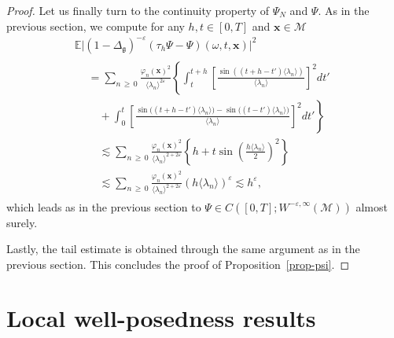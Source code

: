 \documentclass[10pt]{amsart}
\theoremstyle{definition}\newtheorem{defi}[theo]{Definition}\newtheorem{rema}[theo]{Remark}\newtheorem{exam}[theo]{Example}\newtheorem{exem}[theo]{Example}\newtheorem{nota}[theo]{Notation}
\renewcommand{\th}{\tau_h}
\newcommand{\E}{\mathbb{E}}
\newcommand{\x}{\mathbf{x}}
\newcommand{\M}{\mathcal{M}}
\newcommand{\g}{\mathfrak{g}}
\newcommand{\Dlg}{\Delta_{\g}}
\newcommand{\eps}{\varepsilon}
\renewcommand{\o}{\omega}
\newcommand{\les}{\lesssim}
\newcommand{\jb}[1] {\langle #1 \rangle}
\begin{document}
\begin{proof}
Let us finally turn to the continuity property of $\Psi_N$ and $\Psi$. As in the previous section, we compute for any $h,t\in [0,T]$ and $\x\in\M$
\begin{multline*}
\E\big|(1-\Dlg)^{-\eps}(\th \Psi-\Psi)(\o,t,\x)\big|^2 \\
\begin{aligned}
&= \sum_{n\,\geq\,0}\frac{\varphi_n(\x)^2}{\jb{\lambda_n}^{2\eps}}\left\{\int_t^{t+h}\left[\frac{\sin\left((t+h-t')\jb{\lambda_n}\right)}{\jb{\lambda_n}}\right]^2dt'\right. \\
&\quad+\left. \int_0^{t}\left[\frac{\sin\big((t+h-t')\jb{\lambda_n}\big)-\sin\big((t-t')\jb{\lambda_n}\big)}{\jb{\lambda_n}}\right]^2dt'\right\}\\
&\quad\les \sum_{n\,\geq\,0}\frac{\varphi_n(\x)^2}{\jb{\lambda_n}^{2+2\eps}}
\left\{h+t\sin\left(\frac{h\jb{\lambda_n}}{2}\right)^2\right\}\\
&\quad\les \sum_{n\,\geq\,0}\frac{\varphi_n(\x)^2}{\jb{\lambda_n}^{2+2\eps}}(h\jb{\lambda_n})^{\eps} \les h^{\eps},
\end{aligned}
\end{multline*}
which leads as in the previous section to $\Psi\in C([0,T];W^{-\eps,\infty}(\M))$ almost surely.

Lastly, the tail estimate is obtained through the same argument as in the previous section. This concludes the proof of Proposition~\ref{prop-psi}.
\end{proof}



\section{Local well-posedness results}\label{sec-local}
\end{document}
